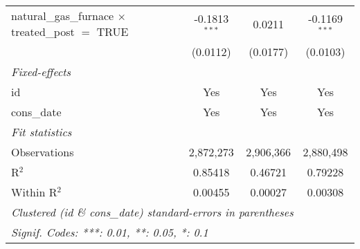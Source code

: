 \begin{tabular}{lccc}
   natural\_gas\_furnace $\times$ treated\_post $=$ TRUE     & -0.1813$^{***}$ & 0.0211          & -0.1169$^{***}$\\   
                                                             & (0.0112)        & (0.0177)        & (0.0103)\\   
   \midrule
   \emph{Fixed-effects}\\
   id                                                        & Yes             & Yes             & Yes\\  
   cons\_date                                                & Yes             & Yes             & Yes\\  
   \midrule
   \emph{Fit statistics}\\
   Observations                                              & 2,872,273       & 2,906,366       & 2,880,498\\  
   R$^2$                                                     & 0.85418         & 0.46721         & 0.79228\\  
   Within R$^2$                                              & 0.00455         & 0.00027         & 0.00308\\  
   \midrule \midrule
   \multicolumn{4}{l}{\emph{Clustered (id \& cons\_date) standard-errors in parentheses}}\\
   \multicolumn{4}{l}{\emph{Signif. Codes: ***: 0.01, **: 0.05, *: 0.1}}\\
\end{tabular}
\par\endgroup


